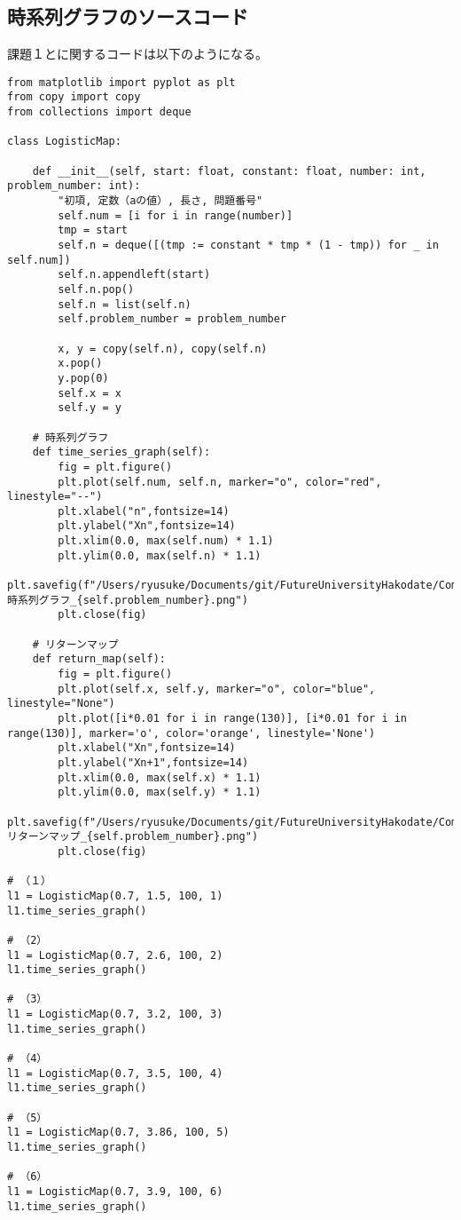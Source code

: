 \documentclass[dvipdfmx,uplatex]{jsarticle}
\begin{document}
\newpage

\subsection{時系列グラフのソースコード}

課題１とに関するコードは以下のようになる。

\begin{lstlisting}[caption=Pythonによる時系列グラフの描画]
from matplotlib import pyplot as plt
from copy import copy
from collections import deque

class LogisticMap:

    def __init__(self, start: float, constant: float, number: int, problem_number: int):
        "初項, 定数（aの値）, 長さ, 問題番号"
        self.num = [i for i in range(number)]
        tmp = start
        self.n = deque([(tmp := constant * tmp * (1 - tmp)) for _ in self.num])
        self.n.appendleft(start)
        self.n.pop()
        self.n = list(self.n)
        self.problem_number = problem_number

        x, y = copy(self.n), copy(self.n)
        x.pop()
        y.pop(0)
        self.x = x
        self.y = y

    # 時系列グラフ
    def time_series_graph(self):
        fig = plt.figure()
        plt.plot(self.num, self.n, marker="o", color="red", linestyle="--")
        plt.xlabel("n",fontsize=14)
        plt.ylabel("Xn",fontsize=14)
        plt.xlim(0.0, max(self.num) * 1.1)
        plt.ylim(0.0, max(self.n) * 1.1)
        plt.savefig(f"/Users/ryusuke/Documents/git/FutureUniversityHakodate/ComplexScienceExercise/result/week01_時系列グラフ_{self.problem_number}.png")
        plt.close(fig)

    # リターンマップ
    def return_map(self):
        fig = plt.figure()
        plt.plot(self.x, self.y, marker="o", color="blue", linestyle="None")
        plt.plot([i*0.01 for i in range(130)], [i*0.01 for i in range(130)], marker='o', color='orange', linestyle='None')
        plt.xlabel("Xn",fontsize=14)
        plt.ylabel("Xn+1",fontsize=14)
        plt.xlim(0.0, max(self.x) * 1.1)
        plt.ylim(0.0, max(self.y) * 1.1)
        plt.savefig(f"/Users/ryusuke/Documents/git/FutureUniversityHakodate/ComplexScienceExercise/result/week01_リターンマップ_{self.problem_number}.png")
        plt.close(fig)

# （１）
l1 = LogisticMap(0.7, 1.5, 100, 1)
l1.time_series_graph()

# （2）
l1 = LogisticMap(0.7, 2.6, 100, 2)
l1.time_series_graph()

# （3）
l1 = LogisticMap(0.7, 3.2, 100, 3)
l1.time_series_graph()

# （4）
l1 = LogisticMap(0.7, 3.5, 100, 4)
l1.time_series_graph()

# （5）
l1 = LogisticMap(0.7, 3.86, 100, 5)
l1.time_series_graph()

# （6）
l1 = LogisticMap(0.7, 3.9, 100, 6)
l1.time_series_graph()
\end{lstlisting}
\end{document}
